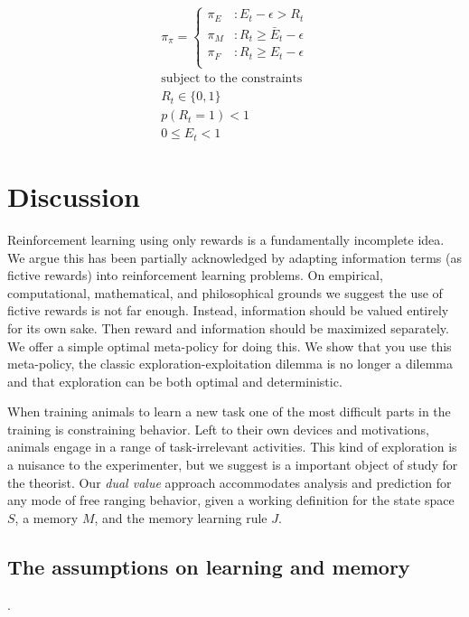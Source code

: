 \documentclass[9pt,twocolumn,twoside]{pnas-new}
\begin{document}
\begin{equation} \label{eq:meta_greedy_3}
    \begin{split}
        \pi_{\pi} = 
        \begin{cases}
            \pi_E & : E_t - \epsilon > R_t \\
            \pi_M & : R_t \geq \bar E_t - \epsilon \\
            \pi_F & : R_t \geq E_t - \epsilon \\
        \end{cases}\\
        \text{subject to the constraints}\\
        R_t \in \{0, 1\}\\ 
        p(R_t = 1) < 1\\
        0 \leq E_t < 1
    \end{split}
\end{equation}


\section*{Discussion}
Reinforcement learning using only rewards is a fundamentally incomplete idea. We argue this has been partially acknowledged by adapting information terms (as fictive rewards) into reinforcement learning problems. On empirical, computational, mathematical, and philosophical grounds we suggest the use of fictive rewards is not far enough. Instead, information should be valued entirely for its own sake. Then reward and information should be maximized separately. We offer a simple optimal meta-policy for doing this. We show that you use this meta-policy, the classic exploration-exploitation dilemma is no longer a dilemma and that exploration can be both optimal and deterministic.

When training animals to learn a new task one of the most difficult parts in the training is constraining behavior. Left to their own devices and motivations, animals engage in a range of task-irrelevant activities. This kind of exploration is a nuisance to the experimenter, but we suggest is a important object of study for the theorist. Our \textit{dual value} approach accommodates analysis and prediction for any mode of free ranging behavior, given a working definition for the state space $S$, a memory $M$, and the memory learning rule $J$.

\subsection*{The assumptions on learning and memory}.
\end{document}
